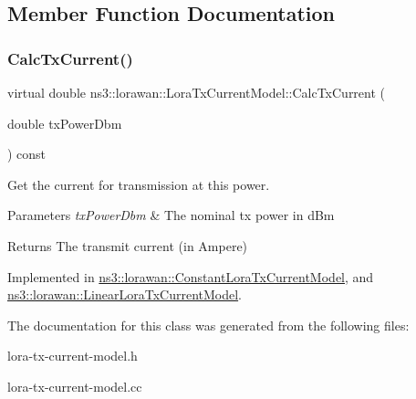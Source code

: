 \subsection{Member Function Documentation}
\mbox{\label{classns3_1_1lorawan_1_1LoraTxCurrentModel_ad4143a40cb10d4cbd4bf838e006780c7}} 
\subsubsection{\texorpdfstring{Calc\+Tx\+Current()}{CalcTxCurrent()}}
{\footnotesize\ttfamily virtual double ns3\+::lorawan\+::\+Lora\+Tx\+Current\+Model\+::\+Calc\+Tx\+Current (\begin{DoxyParamCaption}\item[{double}]{tx\+Power\+Dbm }\end{DoxyParamCaption}) const\hspace{0.3cm}{\ttfamily [pure virtual]}}

Get the current for transmission at this power.


\begin{DoxyParams}{Parameters}
{\em tx\+Power\+Dbm} & The nominal tx power in d\+Bm \\
\hline
\end{DoxyParams}
\begin{DoxyReturn}{Returns}
The transmit current (in Ampere) 
\end{DoxyReturn}


Implemented in \hyperlink{classns3_1_1lorawan_1_1ConstantLoraTxCurrentModel_afd0b31a415eae9f95dd4464612925dad}{ns3\+::lorawan\+::\+Constant\+Lora\+Tx\+Current\+Model}, and \hyperlink{classns3_1_1lorawan_1_1LinearLoraTxCurrentModel_a665f1751a87d6ff09b30c4ca30484b92}{ns3\+::lorawan\+::\+Linear\+Lora\+Tx\+Current\+Model}.



The documentation for this class was generated from the following files\+:\begin{DoxyCompactItemize}
\item 
lora-\/tx-\/current-\/model.\+h\item 
lora-\/tx-\/current-\/model.\+cc\end{DoxyCompactItemize}
